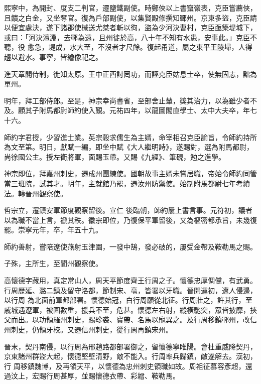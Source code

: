 \begin{pinyinscope}
 熙寧中，為開封、度支二判官，遷鹽鐵副使。時鄭俠以上書竄嶺表，克臣嘗薦俠，且饋之白金，又坐奪官。復為戶部副使，以集賢殿修撰知鄆州。京東多盜，克臣請以便宜處決，遂下諸郡使械送尤桀者斬以徇，盜為少河決曹村，克臣亟築堤城下，或曰：「河決澶淵，去鄆為遠，且州徙於高，八十年不知有水患，安事此。」克臣不聽，役
 愈急，堤成，水大至，不沒者才尺餘。復起甬道，屬之東平王陵埽，人得趨以避水。事寧，皆繪像祀之。



 進天章閣侍制，徙知太原。王中正西討罔功，而誣克臣姑息士卒，使無固志，黜為單州。



 明年，拜工部侍郎。至是，神宗幸尚書省，至部舍止輦，獎其治力，以為雖少者不及。顧其子附馬都尉師約使入覲。元祐四年，以龍圖閣直學士、太中大夫卒，年七十六。



 師約字君授，少習進士業。英宗穀求儒生為主婿，命宰相召克臣諭旨，令師約持所為文至第。明日，獻賦一編，即坐中賦《大人繼明詩》，遂賜對，選為附馬都尉，尚徐國公主。授左衛將軍，面賜玉帶。又賜《九經》、筆硯，勉之進學。



 神宗即位，拜嘉州刺史，遷成州團練使。國朝故事主婿未嘗居職，帝始令師約同管當三班院，試其才。明年，主就館乃罷，遷汝州防禦使。始制附馬都尉七年考績法。轉晉州觀察使。



 哲宗立，遷鎮安軍節度觀察留後。宣仁
 後臨朝，師約屢上書言事。元符初，議者以為職不當上言，褫其秩。徽宗即位，乃復保平軍留後，又為樞密都承旨，未幾復罷。崇寧元年，卒，年五十九。



 師約善射，嘗陪遼使燕射玉津園，一發中鵠，發必破的，屢受金帶及鞍勒馬之賜。



 子殊，主所生，至閬州觀察使。



 高懷德字藏用，真定常山人，周天平節度齊王行周之子。懷德忠厚倜儻，有武勇。行周歷延、潞二鎮及留守洛都，節制宋、亳，皆署以牙職。晉開運初，遼人侵邊，以行周
 為北面前軍都部署。懷德始冠，白行周願從北征。行周壯之，許其行，至戚城遇遼軍，被圍數重，援兵不至，危甚。懷德左右射，縱橫馳突，眾皆披靡，挾父而出。以功領羅州刺史，賜珍裘、寶帶、名馬以寵異之。及行周移鎮鄆州，改信州刺史，仍領牙校。又遷信州刺史，從行周再鎮宋州。



 晉末，契丹南侵，以行周為邢趙路都部署御之，留懷德寧睢陽。會杜重威降契丹，京東諸州群盜大起，懷德堅壁清野，敵不能入。行周率兵歸鎮，敵遂解去。漢初，行
 周移鎮魏博，及再領天平，以懷德為忠州刺史領職如故。周祖征慕容彥超，還過汶上，宏賜行周甚厚，並賜懷德衣帶、彩繒、鞍勒馬。




\end{pinyinscope}

